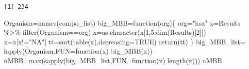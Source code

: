 \documentclass[
  letterpaper,
  DIV=11,
  numbers=noendperiod]{scrreprt}
\newenvironment{Shaded}{}{}
\newcommand{\AttributeTok}[1]{\textcolor[rgb]{0.78,0.47,0.87}{#1}}
\newcommand{\ConstantTok}[1]{\textcolor[rgb]{0.82,0.60,0.40}{#1}}
\newcommand{\ControlFlowTok}[1]{\textcolor[rgb]{0.78,0.47,0.87}{#1}}
\newcommand{\DecValTok}[1]{\textcolor[rgb]{0.82,0.60,0.40}{#1}}
\newcommand{\FunctionTok}[1]{\textcolor[rgb]{0.38,0.69,0.94}{#1}}
\newcommand{\NormalTok}[1]{\textcolor[rgb]{0.67,0.70,0.75}{#1}}
\newcommand{\OtherTok}[1]{\textcolor[rgb]{0.15,0.68,0.38}{#1}}
\newcommand{\SpecialCharTok}[1]{\textcolor[rgb]{0.34,0.71,0.76}{#1}}
\newcommand{\StringTok}[1]{\textcolor[rgb]{0.60,0.76,0.47}{#1}}
\begin{document}
\begin{verbatim}
[1] 234
\end{verbatim}

\begin{Shaded}
\end{Shaded}

\begin{Shaded}
\begin{Highlighting}[]
\NormalTok{Organism}\OtherTok{=}\FunctionTok{names}\NormalTok{(compo\_list)}
\NormalTok{big\_MBB}\OtherTok{=}\ControlFlowTok{function}\NormalTok{(org)\{}
\NormalTok{  org}\OtherTok{=}\StringTok{"hsa"}
\NormalTok{  x}\OtherTok{=}\NormalTok{Results }\SpecialCharTok{\%\textgreater{}\%} \FunctionTok{filter}\NormalTok{(Organism}\SpecialCharTok{==}\NormalTok{org)}
\NormalTok{  x}\OtherTok{=}\FunctionTok{as.character}\NormalTok{(x[}\DecValTok{1}\NormalTok{,}\DecValTok{5}\SpecialCharTok{:}\FunctionTok{dim}\NormalTok{(Results)[}\DecValTok{2}\NormalTok{]])}
\NormalTok{  x}\OtherTok{=}\NormalTok{x[x}\SpecialCharTok{!=}\StringTok{"NA"}\NormalTok{]}
\NormalTok{  tt}\OtherTok{=}\FunctionTok{sort}\NormalTok{(}\FunctionTok{table}\NormalTok{(x),}\AttributeTok{decreasing=}\ConstantTok{TRUE}\NormalTok{)}
  \FunctionTok{return}\NormalTok{(tt)}
\NormalTok{  \}}
\NormalTok{big\_MBB\_list}\OtherTok{=} \FunctionTok{lapply}\NormalTok{(Organism,}\AttributeTok{FUN=}\ControlFlowTok{function}\NormalTok{(x) }\FunctionTok{big\_MBB}\NormalTok{(x))}
\NormalTok{nMBB}\OtherTok{=}\FunctionTok{max}\NormalTok{(}\FunctionTok{sapply}\NormalTok{(big\_MBB\_list,}\AttributeTok{FUN=}\ControlFlowTok{function}\NormalTok{(x) }\FunctionTok{length}\NormalTok{(x)))}
\NormalTok{nMBB}
\end{Highlighting}
\end{Shaded}
\end{document}
